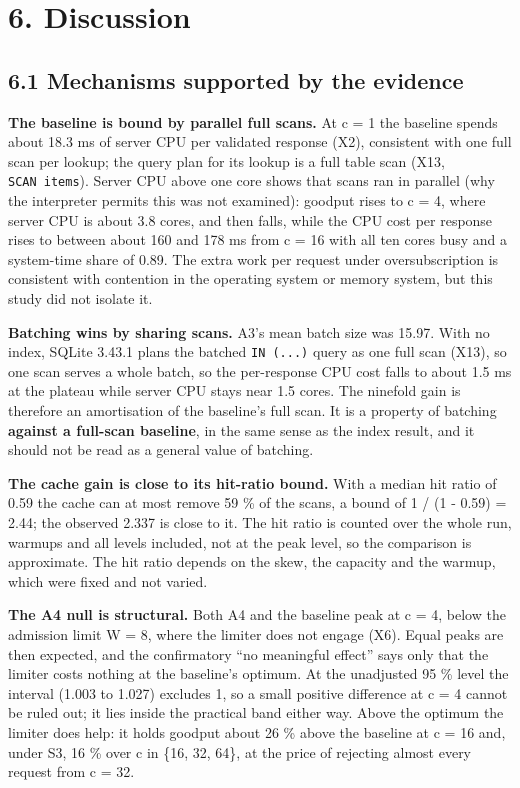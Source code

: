 \documentclass[
]{article}
\begin{document}
\section{6. Discussion}\label{discussion}

\subsection{6.1 Mechanisms supported by the
evidence}\label{mechanisms-supported-by-the-evidence}

\textbf{The baseline is bound by parallel full scans.} At c = 1 the
baseline spends about 18.3 ms of server CPU per validated response (X2),
consistent with one full scan per lookup; the query plan for its lookup
is a full table scan (X13, \texttt{SCAN\ items}). Server CPU above one
core shows that scans ran in parallel (why the interpreter permits this
was not examined): goodput rises to c = 4, where server CPU is about 3.8
cores, and then falls, while the CPU cost per response rises to between
about 160 and 178 ms from c = 16 with all ten cores busy and a
system-time share of 0.89. The extra work per request under
oversubscription is consistent with contention in the operating system
or memory system, but this study did not isolate it.

\textbf{Batching wins by sharing scans.} A3's mean batch size was 15.97.
With no index, SQLite 3.43.1 plans the batched \texttt{IN\ (...)} query
as one full scan (X13), so one scan serves a whole batch, so the
per-response CPU cost falls to about 1.5 ms at the plateau while server
CPU stays near 1.5 cores. The ninefold gain is therefore an amortisation
of the baseline's full scan. It is a property of batching
\textbf{against a full-scan baseline}, in the same sense as the index
result, and it should not be read as a general value of batching.

\textbf{The cache gain is close to its hit-ratio bound.} With a median
hit ratio of 0.59 the cache can at most remove 59 \% of the scans, a
bound of 1 / (1 - 0.59) = 2.44; the observed 2.337 is close to it. The
hit ratio is counted over the whole run, warmups and all levels
included, not at the peak level, so the comparison is approximate. The
hit ratio depends on the skew, the capacity and the warmup, which were
fixed and not varied.

\textbf{The A4 null is structural.} Both A4 and the baseline peak at c =
4, below the admission limit W = 8, where the limiter does not engage
(X6). Equal peaks are then expected, and the confirmatory ``no
meaningful effect'' says only that the limiter costs nothing at the
baseline's optimum. At the unadjusted 95 \% level the interval (1.003 to
1.027) excludes 1, so a small positive difference at c = 4 cannot be
ruled out; it lies inside the practical band either way. Above the
optimum the limiter does help: it holds goodput about 26 \% above the
baseline at c = 16 and, under S3, 16 \% over c in \{16, 32, 64\}, at the
price of rejecting almost every request from c = 32.
\end{document}
